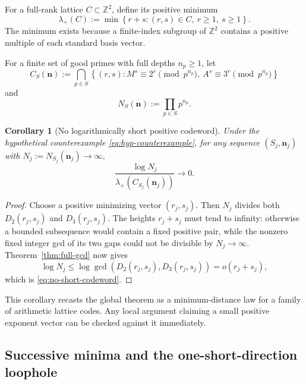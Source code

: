 \documentclass[11pt,oneside]{article}
\newtheorem{corollary}[theorem]{Corollary}
\theoremstyle{definition}
\newcommand{\Z}{\mathbb{Z}}
\newcommand{\set}[1]{\left\{#1\right\}}
\begin{document}
For a full-rank lattice $C\subset\Z^2$, define its positive minimum
\begin{equation}\label{eq:positive-minimum}
  \lambda_+(C):=
  \min\set{r+s:(r,s)\in C,\ r\ge1,\ s\ge1}.
\end{equation}
The minimum exists because a finite-index subgroup of $\Z^2$ contains a
positive multiple of each standard basis vector.

For a finite set of good primes with full depths $n_p\ge1$, let
\begin{equation}\label{eq:full-S-lattice}
  C_S(\bm n):=\bigcap_{p\in S}
  \set{(r,s):M^s\equiv2^r\pmod{p^{n_p}},\
                   A^s\equiv3^r\pmod{p^{n_p}}}
\end{equation}
and
\begin{equation}\label{eq:N-S}
  N_S(\bm n):=\prod_{p\in S}p^{n_p}.
\end{equation}

\begin{corollary}[No logarithmically short positive codeword]
\label{cor:no-short-codeword}
Under the hypothetical counterexample \eqref{eq:hyp-counterexample}, for
any sequence $(S_j,\bm n_j)$ with $N_j:=N_{S_j}(\bm n_j)\to\infty$,
\begin{equation}\label{eq:no-short-codeword}
  \frac{\log N_j}{\lambda_+(C_{S_j}(\bm n_j))}\longrightarrow0.
\end{equation}
\end{corollary}

\begin{proof}
Choose a positive minimizing vector $(r_j,s_j)$.  Then $N_j$ divides both
$D_2(r_j,s_j)$ and $D_3(r_j,s_j)$.  The heights $r_j+s_j$ must tend to
infinity: otherwise a bounded subsequence would contain a fixed positive
pair, while the nonzero fixed integer gcd of its two gaps could not be
divisible by $N_j\to\infty$.  Theorem~\ref{thm:full-gcd} now gives
\[
  \log N_j
  \le\log\gcd(D_2(r_j,s_j),D_3(r_j,s_j))
  =o(r_j+s_j),
\]
which is \eqref{eq:no-short-codeword}.
\end{proof}

This corollary recasts the global theorem as a minimum-distance law for a
family of arithmetic lattice codes.  Any local argument claiming a small
positive exponent vector can be checked against it immediately.

\subsection{Successive minima and the one-short-direction loophole}
\end{document}
